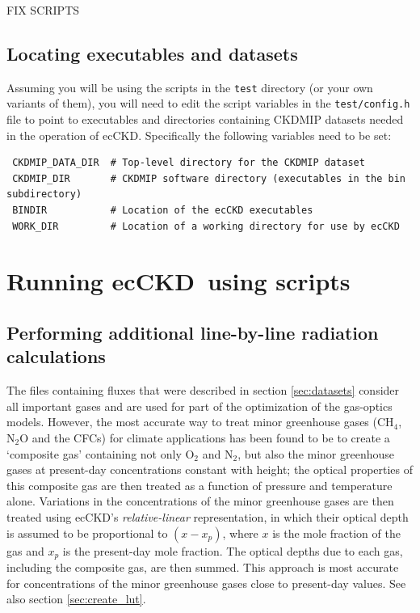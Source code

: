 \documentclass[a4,oneside]{article}
\def\codesize{\small}
\newcommand{\ecckd}{ecCKD}
\def\codesize{\small}
\def\code#1{{\codesize\texttt{#1}}}
\begin{document}
FIX SCRIPTS

\subsection{Locating executables and datasets}
Assuming you will be using the scripts in the \code{test} directory
(or your own variants of them), you will need to edit the script
variables in the \code{test/config.h} file to point to executables and
directories containing CKDMIP datasets needed in the operation of
\ecckd. Specifically the following variables need to be set:
\begin{lstlisting}
 CKDMIP_DATA_DIR  # Top-level directory for the CKDMIP dataset
 CKDMIP_DIR       # CKDMIP software directory (executables in the bin subdirectory)
 BINDIR           # Location of the ecCKD executables
 WORK_DIR         # Location of a working directory for use by ecCKD
\end{lstlisting}

\section{Running \ecckd\ using scripts}
\label{sec:scripts}
\subsection{Performing additional line-by-line radiation calculations}
\label{sec:additional}
The files containing fluxes that were described in section
\ref{sec:datasets} consider all important gases and are used for part
of the optimization of the gas-optics models. However, the most
accurate way to treat minor greenhouse gases (CH$_4$, N$_2$O and the
CFCs) for climate applications has been found to be to create a
`composite gas' containing not only O$_2$ and N$_2$, but also the
minor greenhouse gases at present-day concentrations constant with
height; the optical properties of this composite gas are then treated
as a function of pressure and temperature alone. Variations in the
concentrations of the minor greenhouse gases are then treated using
\ecckd's \emph{relative-linear} representation, in which their optical
depth is assumed to be proportional to $(x-x_p)$, where $x$ is the
mole fraction of the gas and $x_p$ is the present-day mole
fraction. The optical depths due to each gas, including the composite
gas, are then summed. This approach is most accurate for
concentrations of the minor greenhouse gases close to present-day
values. See also section \ref{sec:create_lut}.
\end{document}
